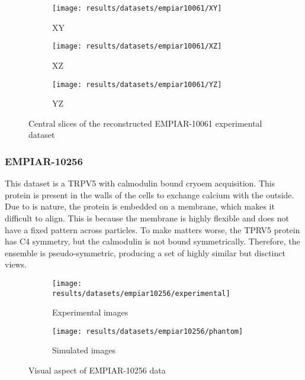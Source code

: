 \documentclass[../main.tex]{subfiles}
\begin{document}
\begin{figure}[htbp]
    \centering
    \begin{subfigure}[b]{0.3\textwidth}
         \centering
         \texttt{[image: results/datasets/empiar10061/XY]}
         \caption{XY}
    \end{subfigure}
    \hfill
    \begin{subfigure}[b]{0.3\textwidth}
         \centering
         \texttt{[image: results/datasets/empiar10061/XZ]}
         \caption{XZ}
    \end{subfigure}
    \hfill
    \begin{subfigure}[b]{0.3\textwidth}
         \centering
         \texttt{[image: results/datasets/empiar10061/YZ]}
         \caption{YZ}
    \end{subfigure}

    \caption{Central slices of the reconstructed EMPIAR-10061 experimental dataset}
    \label{fig:5:empiar10061_rec}
\end{figure}

\subsubsection{EMPIAR-10256}
This dataset is  a TRPV5 with calmodulin bound \gls{cryoem} acquisition\cite{dang2019}\cite{empiar10256}. This protein is present in the walls of the cells to exchange calcium with the outside. Due to is nature, the protein is embedded on a membrane, which makes it difficult to align. This is because the membrane is highly flexible and does not have a fixed pattern across particles. To make matters worse, the TPRV5 protein has C4 symmetry, but the calmodulin is not bound symmetrically. Therefore, the ensemble is pseudo-symmetric, producing a set of highly similar but disctinct views.

\begin{figure}[htbp]
    \centering
    \begin{subfigure}[b]{0.45\textwidth}
         \centering
         \texttt{[image: results/datasets/empiar10256/experimental]}
         \caption{Experimental images}
    \end{subfigure}
    \hfill
    \begin{subfigure}[b]{0.45\textwidth}
         \centering
         \texttt{[image: results/datasets/empiar10256/phantom]}
         \caption{Simulated images}
    \end{subfigure}
    \caption{Visual aspect of EMPIAR-10256 data}
    \label{fig:5:empiar10256}
\end{figure}
\end{document}
